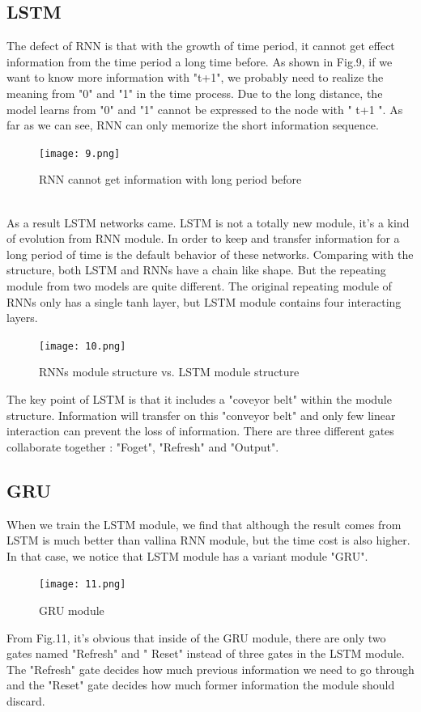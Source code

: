 \documentclass{article}
\begin{document}
\subsection{LSTM}
\noindent The defect of RNN is that with the growth of time period, it cannot get effect information from the time period a long time before. As shown in Fig.9, if we want to know more information with "t+1", we probably need to realize the meaning from "0" and "1" in the time process. Due to the long distance, the model learns from "0" and "1" cannot be expressed to the node with " t+1 ". As far as we can see, RNN can only memorize the short information sequence.
\begin{figure}[h]
	\centering
	\texttt{[image: 9.png]}
	\caption{RNN cannot get information with long period before}
\end{figure}\\
\noindent As a result LSTM networks came. LSTM is not a totally new module, it's a kind of evolution from RNN module. In order to keep and transfer information for a long period of time is the default behavior of these networks. Comparing with the structure, both LSTM and RNNs have a chain like shape. But the repeating module from two models are quite different. The original repeating module of RNNs only has a single tanh layer, but LSTM module contains four interacting layers.
\begin{figure}[H]
	\centering
	\texttt{[image: 10.png]}
	\caption{RNNs module structure vs. LSTM module structure}
\end{figure}
\noindent The key point of LSTM is that it includes a "coveyor belt" within the module structure. Information will transfer on this "conveyor belt" and only few linear interaction can prevent the loss of information. There are three different gates collaborate together : "Foget", "Refresh" and "Output". \\
\subsection{GRU}
\noindent When we train the LSTM module, we find that although the result comes from LSTM is much better than vallina RNN module, but the time cost is also higher. In that case, we notice that LSTM module has a variant module "GRU".
\begin{figure}[H]
	\centering
	\texttt{[image: 11.png]}
	\caption{GRU module}
\end{figure}
\noindent From Fig.11, it's obvious that inside of the GRU module, there are only two gates named "Refresh" and " Reset" instead of three gates in the LSTM module. The "Refresh" gate decides how much previous information we need to go through and the "Reset" gate decides how much former information the module should discard.\\
\end{document}
